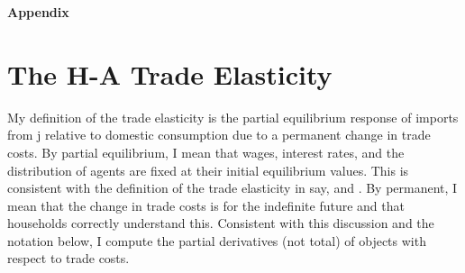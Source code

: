 \documentclass[12pt,pdftex]{article}
\begin{document}
\begin{onehalfspacing}
\appendix

\clearpage
\newpage

\begin{center}
\textbf{\Large Appendix}
\end{center}


\section{The H-A Trade Elasticity}

My definition of the trade elasticity is the partial equilibrium response of imports from j relative
to domestic consumption due to a permanent change in trade costs. By partial equilibrium, I
mean that wages, interest rates, and the distribution of agents are fixed at their initial equilibrium values. This is consistent with the definition of the trade elasticity in say, \citet{arkolakis2012new} and \citet{simonovska2014elasticity}. By permanent, I mean that the change in trade costs is for the indefinite future and that households correctly understand this. Consistent with this discussion and the notation below, I compute the partial derivatives (not total) of objects with respect to trade costs.


\end{onehalfspacing}
\end{document}
